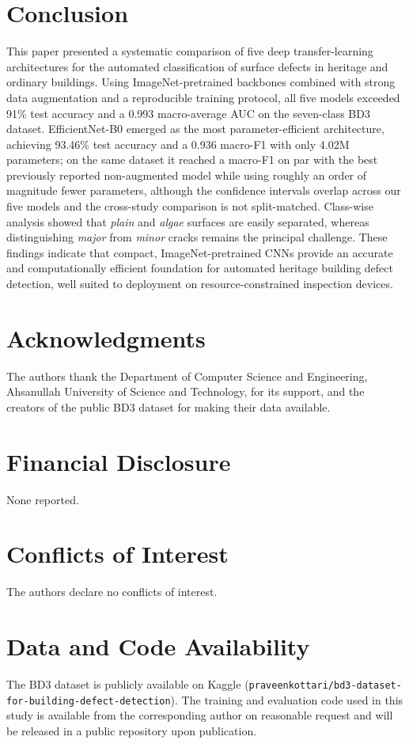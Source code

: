 \documentclass[ASNA, twocolumn]{USG}
\begin{document}
\section{Conclusion}

This paper presented a systematic comparison of five deep transfer-learning architectures for the automated classification of surface defects in heritage and ordinary buildings. Using ImageNet-pretrained backbones combined with strong data augmentation and a reproducible training protocol, all five models exceeded 91\% test accuracy and a 0.993 macro-average AUC on the seven-class BD3 dataset. EfficientNet-B0 emerged as the most parameter-efficient architecture, achieving 93.46\% test accuracy and a 0.936 macro-F1 with only 4.02M parameters; on the same dataset it reached a macro-F1 on par with the best previously reported non-augmented model while using roughly an order of magnitude fewer parameters, although the confidence intervals overlap across our five models and the cross-study comparison is not split-matched. Class-wise analysis showed that \textit{plain} and \textit{algae} surfaces are easily separated, whereas distinguishing \textit{major} from \textit{minor} cracks remains the principal challenge. These findings indicate that compact, ImageNet-pretrained CNNs provide an accurate and computationally efficient foundation for automated heritage building defect detection, well suited to deployment on resource-constrained inspection devices.

\section*{Acknowledgments}
The authors thank the Department of Computer Science and Engineering, Ahsanullah University of Science and Technology, for its support, and the creators of the public BD3 dataset for making their data available.

\section*{Financial Disclosure}
None reported.

\section*{Conflicts of Interest}
The authors declare no conflicts of interest.

\section*{Data and Code Availability}
The BD3 dataset is publicly available on Kaggle (\texttt{praveenkottari/bd3-dataset-for-building-defect-detection}). The training and evaluation code used in this study is available from the corresponding author on reasonable request and will be released in a public repository upon publication.
\end{document}
